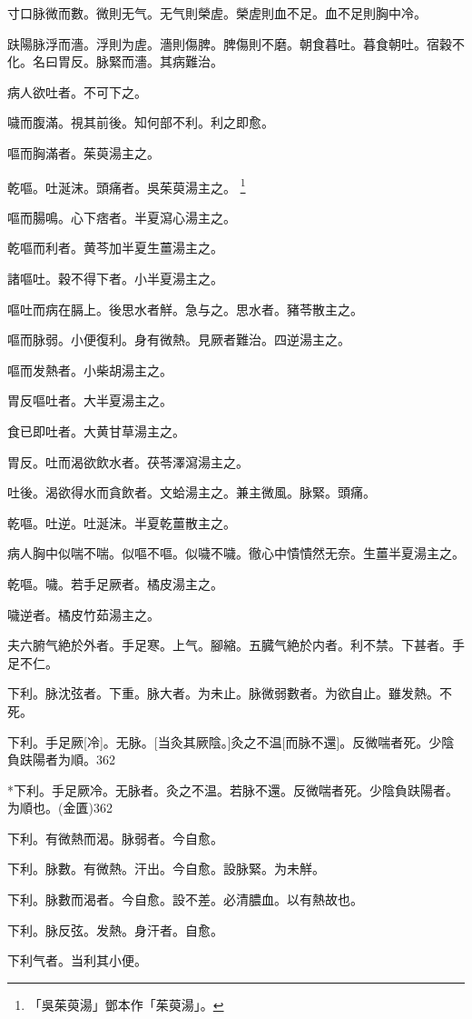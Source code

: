 \documentclass[12pt,twoside,UTF8,b5paper]{ctexbook}
\begin{document}
寸口脉微而數。微則无气。无气則榮虗。榮虗則血不足。血不足則胸中冷。

趺陽脉浮而濇。浮則为虗。濇則傷脾。脾傷則不磨。朝食暮吐。暮食朝吐。宿穀不化。名曰胃反。脉緊而濇。其病難治。

病人欲吐者。不可下之。

噦而腹滿。視其前後。知何部不利。利之即愈。

嘔而胸滿者。茱萸湯主之。

乾嘔。吐涎沫。頭痛者。吳茱萸湯主之。
	\footnote{「吳茱萸湯」鄧本作「茱萸湯」。}

嘔而腸鳴。心下痞者。半夏瀉心湯主之。

乾嘔而利者。黄芩加半夏生薑湯主之。

諸嘔吐。穀不得下者。小半夏湯主之。

嘔吐而病在膈上。後思水者觧。急与之。思水者。豬苓散主之。

嘔而脉弱。小便復利。身有微熱。見厥者難治。四逆湯主之。

嘔而发熱者。小柴胡湯主之。

胃反嘔吐者。大半夏湯主之。

食已即吐者。大黄甘草湯主之。

胃反。吐而渴欲飲水者。茯苓澤瀉湯主之。

吐後。渴欲得水而貪飲者。文蛤湯主之。兼主微風。脉緊。頭痛。

乾嘔。吐逆。吐涎沫。半夏乾薑散主之。

病人胸中似喘不喘。似嘔不嘔。似噦不噦。徹心中憒憒然无奈。生薑半夏湯主之。

乾嘔。噦。若手足厥者。橘皮湯主之。

噦逆者。橘皮竹茹湯主之。

夫六腑气絶於外者。手足寒。上气。腳縮。五臓气絶於内者。利不禁。下甚者。手足不仁。

下利。脉沈弦者。下重。脉大者。为未止。脉微弱數者。为欲自止。雖发熱。不死。

下利。手足厥[冷]。无脉。[当灸其厥陰。]灸之不温[而脉不還]。反微喘者死。少陰負趺陽者为順。362

*下利。手足厥冷。无脉者。灸之不温。若脉不還。反微喘者死。少陰負趺陽者。为順也。(金匱)362

下利。有微熱而渴。脉弱者。今自愈。

下利。脉數。有微熱。汗出。今自愈。設脉緊。为未觧。

下利。脉數而渴者。今自愈。設不差。必清膿血。以有熱故也。

下利。脉反弦。发熱。身汗者。自愈。

下利气者。当利其小便。
\end{document}
